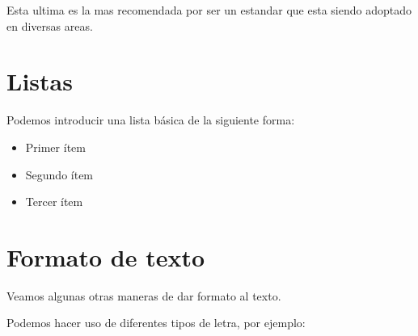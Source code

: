 \documentclass[letterpaper,12pt]{article}
\begin{document}
\noindent Esta ultima es la mas recomendada por ser un estandar que esta siendo adoptado en diversas areas.

\section{Listas}

Podemos introducir una lista básica de la siguiente forma:

\begin{itemize}
\item Primer ítem
\item Segundo ítem
\item Tercer ítem
\end{itemize}

\section{Formato de texto}

Veamos algunas otras maneras de dar formato al texto.

Podemos hacer uso de diferentes tipos de letra, por ejemplo:

\end{document}
